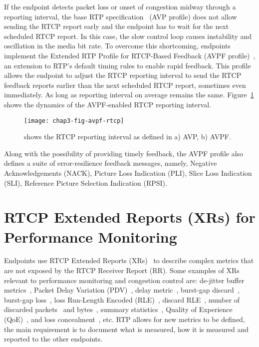 
If the endpoint detects packet loss or onset of congestion midway through a
reporting interval, the base RTP specification~\cite{rfc3550} (AVP profile)
does not allow sending the RTCP report early and the endpoint has to wait for
the next scheduled RTCP report. In this case, the slow control loop causes
instability and oscillation in the media bit rate. To overcome this
shortcoming, endpoints implement the Extended RTP Profile for RTCP-Based
Feedback (AVPF profile)~\cite{rfc4585}, an extension to RTP's default timing
rules to enable rapid feedback. This profile allows the endpoint to adjust the
RTCP reporting interval to send the RTCP feedback reports earlier than the
next scheduled RTCP report, sometimes even immediately. As long as reporting
interval on average remains the same. Figure~\ref{fig:3:avpf.interval} shows
the dynamics of the AVPF-enabled RTCP reporting interval.

\begin{figure}[!h]
\centerline{\texttt{[image: chap3-fig-avpf-rtcp]}}
\caption{shows the RTCP reporting interval as defined in a) AVP, b) AVPF.}
\label{fig:3:avpf.interval}
\end{figure}


Along with the possibility of providing timely feedback, the AVPF profile also
defines a suite of error-resilience feedback messages, namely, Negative
Acknowledgements (NACK), Picture Loss Indication (PLI), Slice Loss Indication
(SLI), Reference Picture Selection Indication (RPSI).

\section{RTCP Extended Reports (XRs) for Performance Monitoring}

Endpoints use RTCP Extended Reports (XRs)~\cite{rfc3611} to describe complex
metrics that are not exposed by the RTCP Receiver Report (RR). Some examples of
XRs relevant to performance monitoring and congestion control are: de-jitter
buffer metrics~\cite{rfc7005}, Packet Delay Variation (PDV)~\cite{rfc6798},
delay metric~\cite{rfc6843}, burst-gap discard~\cite{rfc7003}, burst-gap
loss~\cite{rfc6958}, loss Run-Length Encoded (RLE)~\cite{rfc3611}, discard
RLE~\cite{rfc7097}, number of discarded packets~\cite{rfc7002} and
bytes~\cite{draft.xr.bytes.discarded}, summary statistics~\cite{rfc7004},
Quality of Experience (QoE)~\cite{draft.xr.qoe}, and loss
concealment~\cite{draft.xr.conceal}, etc. RTP allows for new metrics to be
defined, the main requirement is to document what is measured, how it is
measured and reported to the other endpoints.


